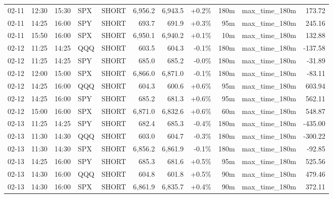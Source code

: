 \documentclass[11pt,a4paper,twoside]{article}
\begin{document}
\begin{center}
\begin{longtable}{>{\color{txtmain}}l l l l l r r r r >{\color{txtmain}}l r}
02-11 & 12:30 & 15:30 & SPX & SHORT & 6,956.2 & 6,943.5 & \textcolor{wingreen}{+0.2\%} & 180m & max\_time\_180m & \textcolor{wingreen}{173.72} \\
02-11 & 14:25 & 16:00 & SPY & SHORT & 693.7 & 691.9 & \textcolor{wingreen}{+0.3\%} & 95m & max\_time\_180m & \textcolor{wingreen}{245.16} \\
02-11 & 15:50 & 16:00 & SPX & SHORT & 6,950.1 & 6,940.2 & \textcolor{wingreen}{+0.1\%} & 10m & max\_time\_180m & \textcolor{wingreen}{132.88} \\
02-12 & 11:25 & 14:25 & QQQ & SHORT & 603.5 & 604.3 & \textcolor{lossred}{-0.1\%} & 180m & max\_time\_180m & \textcolor{lossred}{-137.58} \\
02-12 & 11:25 & 14:25 & SPY & SHORT & 685.0 & 685.2 & \textcolor{lossred}{-0.0\%} & 180m & max\_time\_180m & \textcolor{lossred}{-31.89} \\
02-12 & 12:00 & 15:00 & SPX & SHORT & 6,866.0 & 6,871.0 & \textcolor{lossred}{-0.1\%} & 180m & max\_time\_180m & \textcolor{lossred}{-83.11} \\
02-12 & 14:25 & 16:00 & QQQ & SHORT & 604.3 & 600.6 & \textcolor{wingreen}{+0.6\%} & 95m & max\_time\_180m & \textcolor{wingreen}{603.94} \\
02-12 & 14:25 & 16:00 & SPY & SHORT & 685.2 & 681.3 & \textcolor{wingreen}{+0.6\%} & 95m & max\_time\_180m & \textcolor{wingreen}{562.11} \\
02-12 & 15:00 & 16:00 & SPX & SHORT & 6,871.0 & 6,832.6 & \textcolor{wingreen}{+0.6\%} & 60m & max\_time\_180m & \textcolor{wingreen}{548.87} \\
02-13 & 11:25 & 14:25 & SPY & SHORT & 682.4 & 685.3 & \textcolor{lossred}{-0.4\%} & 180m & max\_time\_180m & \textcolor{lossred}{-435.00} \\
02-13 & 11:30 & 14:30 & QQQ & SHORT & 603.0 & 604.7 & \textcolor{lossred}{-0.3\%} & 180m & max\_time\_180m & \textcolor{lossred}{-300.22} \\
02-13 & 11:30 & 14:30 & SPX & SHORT & 6,856.2 & 6,861.9 & \textcolor{lossred}{-0.1\%} & 180m & max\_time\_180m & \textcolor{lossred}{-92.85} \\
02-13 & 14:25 & 16:00 & SPY & SHORT & 685.3 & 681.6 & \textcolor{wingreen}{+0.5\%} & 95m & max\_time\_180m & \textcolor{wingreen}{525.56} \\
02-13 & 14:30 & 16:00 & QQQ & SHORT & 604.8 & 601.8 & \textcolor{wingreen}{+0.5\%} & 90m & max\_time\_180m & \textcolor{wingreen}{479.46} \\
02-13 & 14:30 & 16:00 & SPX & SHORT & 6,861.9 & 6,835.7 & \textcolor{wingreen}{+0.4\%} & 90m & max\_time\_180m & \textcolor{wingreen}{372.11} \\

\end{longtable}
\end{center}
\end{document}
